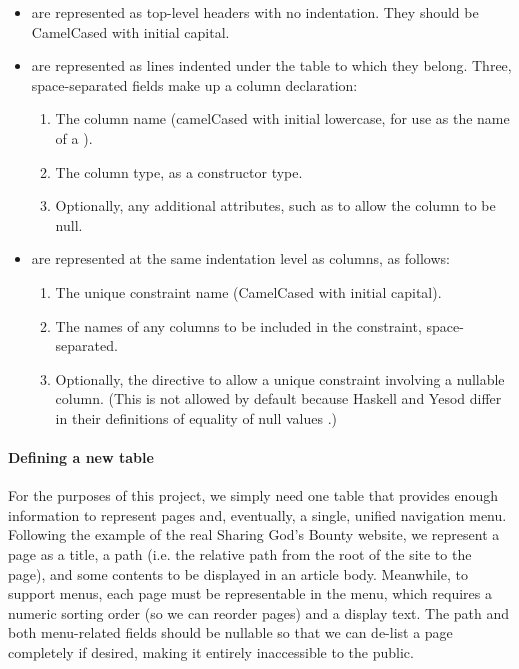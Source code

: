 \begin{itemize}
  \item {} are represented as top-level headers with no indentation. They should be CamelCased with initial capital.
  \item {} are represented as lines indented under the table to which they belong. Three, space-separated fields make up a column declaration: 
  \begin{enumerate}
    \item The column name (camelCased with initial lowercase, for use as the name of a ).
    \item The column type, as a  constructor type.
    \item Optionally, any additional attributes, such as  to allow the column to be null.
  \end{enumerate}
  \item {} are represented at the same indentation level as columns, as follows:
  \begin{enumerate}
    \item The unique constraint name (CamelCased with initial capital).
    \item The names of any columns to be included in the constraint, space-separated.
    \item Optionally, the  directive to allow a unique constraint involving a nullable column. (This is not allowed by default because Haskell and Yesod differ in their definitions of equality of null values \cite{ybkPersistent}.)
  \end{enumerate}
\end{itemize}

\paragraph{Defining a new table}

For the purposes of this project, we simply need one table that provides enough information to represent pages and, eventually, a single, unified navigation menu. Following the example of the real Sharing God's Bounty website, we represent a page as a title, a path (i.e. the relative path from the root of the site to the page), and some contents to be displayed in an article body. Meanwhile, to support menus, each page must be representable in the menu, which requires a numeric sorting order (so we can reorder pages) and a display text. The path and both menu-related fields should be nullable so that we can de-list a page completely if desired, making it entirely inaccessible to the public.

